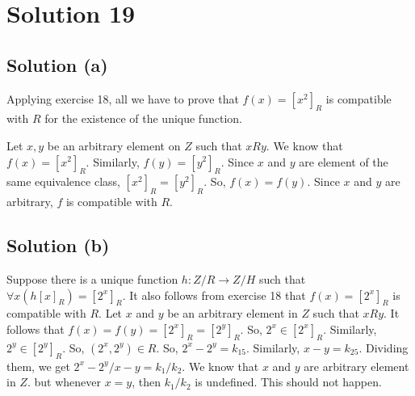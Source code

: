 \documentclass{article}
\begin{document}
\section{Solution 19}
\subsection{Solution (a)}
Applying exercise 18, all we have to prove that $f(x) = [x^2]_R$ is
compatible with $R$ for the existence of the unique function.

Let $x,y$ be an arbitrary element on $Z$ such that $xRy$. We know that
$f(x) = [x^2]_R$. Similarly, $f(y) = [y^2]_R$. Since $x$ and $y$ are
element of the same equivalence class, $[x^2]_R = [y^2]_R$. So, $f(x)
= f(y)$. Since $x$ and $y$ are arbitrary, $f$ is compatible with $R$.

\subsection{Solution (b)}
Suppose there is a unique function $h: Z/R \to Z/H$ such that $\forall
x(h[x]_R) = [2^x]_R$. It also follows from exercise 18 that $f(x) =
[2^x]_R$ is compatible with $R$. Let $x$ and $y$ be an arbitrary
element in $Z$ such that $xRy$. It follows that $f(x) = f(y) = [2^x]_R
= [2^y]_R$. So, $2^x \in [2^x]_R$. Similarly, $2^y \in [2^y]_R$. So,
$(2^x, 2^y) \in R$. So, $2^x - 2^y = k_15$. Similarly, $x-y=k_25$.
Dividing them, we get $2^x - 2^y / x-y = k_1 / k_2$. We know that $x$
and $y$ are arbitrary element in $Z$. but whenever $x = y$, then
$k_1/k_2$ is undefined. This should not happen.
\end{document}

